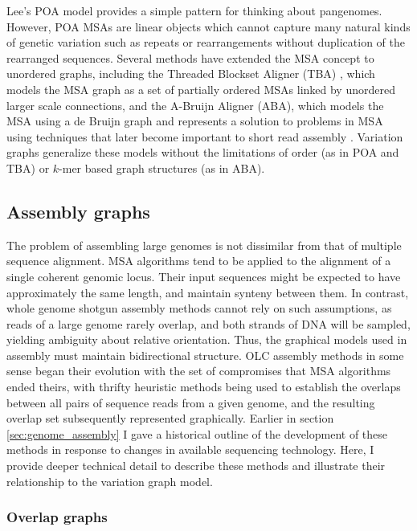 \documentclass[a4paper,12pt,numbered,oneside]{Classes/PhDThesisPSnPDF}
\begin{document}
Lee's POA model provides a simple pattern for thinking about pangenomes.
However, POA MSAs are linear objects which cannot capture many natural kinds of genetic variation such as repeats or rearrangements without duplication of the rearranged sequences.
Several methods have extended the MSA concept to unordered graphs, including the Threaded Blockset Aligner (TBA) \cite{blanchette2004aligning}, which models the MSA graph as a set of partially ordered MSAs linked by unordered larger scale connections, and the A-Bruijn Aligner (ABA), which models the MSA using a de Bruijn graph and represents a solution to problems in MSA using techniques that later become important to short read assembly \cite{raphael2004novel}.
Variation graphs generalize these models without the limitations of order (as in POA and TBA) or $k$-mer based graph structures (as in ABA).

\subsection{Assembly graphs}

The problem of assembling large genomes is not dissimilar from that of multiple sequence alignment.
MSA algorithms tend to be applied to the alignment of a single coherent genomic locus.
Their input sequences might be expected to have approximately the same length, and maintain synteny between them.
In contrast, whole genome shotgun assembly methods cannot rely on such assumptions, as reads of a large genome rarely overlap, and both strands of DNA will be sampled, yielding ambiguity about relative orientation.
Thus, the graphical models used in assembly must maintain bidirectional structure.
OLC assembly methods in some sense began their evolution with the set of compromises that MSA algorithms ended theirs, with thrifty heuristic methods being used to establish the overlaps between all pairs of sequence reads from a given genome, and the resulting overlap set subsequently represented graphically.
Earlier in section \ref{sec:genome_assembly} I gave a historical outline of the development of these methods in response to changes in available sequencing technology.
Here, I provide deeper technical detail to describe these methods and illustrate their relationship to the variation graph model.

\subsubsection{Overlap graphs}
\label{sec:overlap_graphs}
\end{document}
